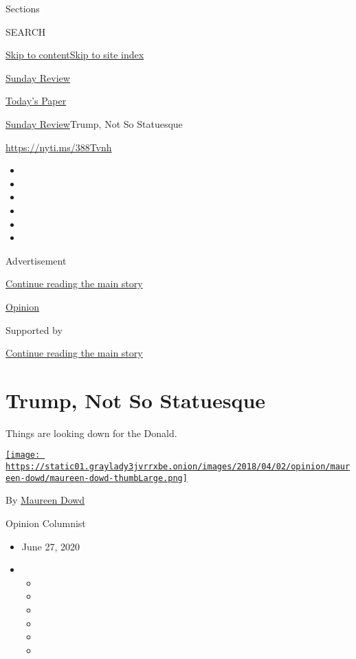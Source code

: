 Sections

SEARCH

\protect\hyperlink{site-content}{Skip to
content}\protect\hyperlink{site-index}{Skip to site index}

\href{https://www.nytimes3xbfgragh.onion/section/opinion/sunday}{Sunday
Review}

\href{https://myaccount.nytimes3xbfgragh.onion/auth/login?response_type=cookie\&client_id=vi}{}

\href{https://www.nytimes3xbfgragh.onion/section/todayspaper}{Today's
Paper}

\href{/section/opinion/sunday}{Sunday Review}\textbar{}Trump, Not So
Statuesque

\href{https://nyti.ms/388Tvnh}{https://nyti.ms/388Tvnh}

\begin{itemize}
\item
\item
\item
\item
\item
\item
\end{itemize}

Advertisement

\protect\hyperlink{after-top}{Continue reading the main story}

\href{/section/opinion}{Opinion}

Supported by

\protect\hyperlink{after-sponsor}{Continue reading the main story}

\hypertarget{trump-not-so-statuesque}{%
\section{Trump, Not So Statuesque}\label{trump-not-so-statuesque}}

Things are looking down for the Donald.

\href{https://www.nytimes3xbfgragh.onion/by/maureen-dowd}{\texttt{[image: https://static01.graylady3jvrrxbe.onion/images/2018/04/02/opinion/maureen-dowd/maureen-dowd-thumbLarge.png]}}

By \href{https://www.nytimes3xbfgragh.onion/by/maureen-dowd}{Maureen
Dowd}

Opinion Columnist

\begin{itemize}
\item
  June 27, 2020
\item
  \begin{itemize}
  \item
  \item
  \item
  \item
  \item
  \item
  \end{itemize}
\end{itemize}


